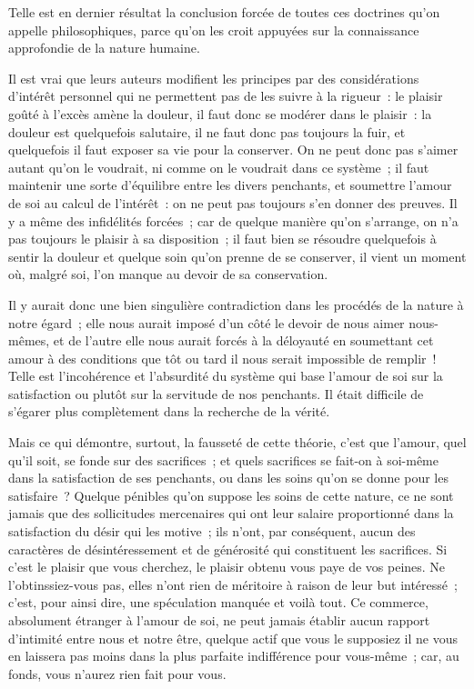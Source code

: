 \documentclass[french,twoside]{book} %
\begin{document}
Telle est en dernier résultat la conclusion forcée de toutes ces doctrines qu’on appelle philosophiques, parce qu’on les croit appuyées sur la connaissance approfondie de la nature humaine.\par
Il est vrai que leurs auteurs modifient les principes par des considérations d’intérêt personnel qui ne permettent pas de les suivre à la rigueur : le plaisir goûté à l’excès amène la douleur, il faut donc se modérer dans le plaisir : la douleur est quelquefois salutaire, il ne faut donc pas toujours la fuir, et quelquefois il faut exposer sa vie pour la conserver. On ne peut donc pas s’aimer autant qu’on le voudrait, ni comme on le voudrait dans ce système ; il faut maintenir une sorte d’équilibre entre les divers penchants, et soumettre l’amour de soi au calcul de l’intérêt : on ne peut pas toujours s’en donner des preuves. Il y a même des infidélités forcées ; car de quelque manière qu’on s’arrange, on n’a pas toujours le plaisir à sa disposition ; il faut bien se résoudre quelquefois à sentir la douleur et quelque soin qu’on prenne de se conserver, il vient un moment où, malgré soi, l’on manque au devoir de sa conservation.\par
Il y aurait donc une bien singulière contradiction dans les procédés de la nature à notre égard ; elle nous aurait imposé d’un côté le devoir de nous aimer nous-mêmes, et de l’autre elle nous aurait forcés à la déloyauté en soumettant cet amour à des conditions que tôt ou tard il nous serait impossible de remplir ! Telle est l’incohérence et l’absurdité du système qui base l’amour de soi sur la satisfaction ou plutôt sur la servitude de nos penchants. Il était difficile de s’égarer plus complètement dans la recherche de la vérité.\par
Mais ce qui démontre, surtout, la fausseté de cette théorie, c’est que l’amour, quel qu’il soit, se fonde sur des sacrifices ; et quels sacrifices se fait-on à soi-même dans la satisfaction de ses penchants, ou dans les soins qu’on se donne pour les satisfaire ? Quelque pénibles qu’on suppose les soins de cette nature, ce ne sont jamais que des sollicitudes mercenaires qui ont leur salaire proportionné dans la satisfaction du désir qui les motive ; ils n’ont, par conséquent, aucun des caractères de désintéressement et de générosité qui constituent les sacrifices. Si c’est le plaisir que vous cherchez, le plaisir obtenu vous paye de vos peines. Ne l’obtinssiez-vous pas, elles n’ont rien de méritoire à raison de leur but intéressé ; c’est, pour ainsi dire, une spéculation manquée et voilà tout. Ce commerce, absolument étranger à l’amour de soi, ne peut jamais établir aucun rapport d’intimité entre nous et notre être, quelque actif que vous le supposiez il ne vous en laissera pas moins dans la plus parfaite indifférence pour vous-même ; car, au fonds, vous n’aurez rien fait pour vous.\par
\end{document}
